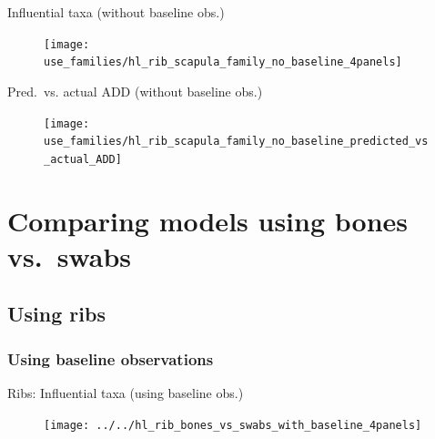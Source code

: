 \documentclass{beamer}
\begin{document}
\begin{frame}{Influential taxa (without baseline obs.)}

  \begin{center}
    \begin{figure}
      \texttt{[image: use\_families/hl\_rib\_scapula\_family\_no\_baseline\_4panels]}
    \end{figure}
  \end{center}

\end{frame}


\begin{frame}{Pred.\ vs. actual ADD (without baseline obs.)}

  \begin{center}
    \begin{figure}
      \texttt{[image: use\_families/hl\_rib\_scapula\_family\_no\_baseline\_predicted\_vs\_actual\_ADD]}
    \end{figure}
  \end{center}

\end{frame}





\section[Bones vs.\ swabs]{Comparing models using bones vs.\ swabs}

\subsection[Ribs]{Using ribs}

\subsubsection[With baseline]{Using baseline observations}

\begin{frame}{Ribs: Influential taxa (using baseline obs.)}

  \begin{center}
    \begin{figure}
      \texttt{[image: ../../hl\_rib\_bones\_vs\_swabs\_with\_baseline\_4panels]}
    \end{figure}
  \end{center}
  
\end{frame}
\end{document}
